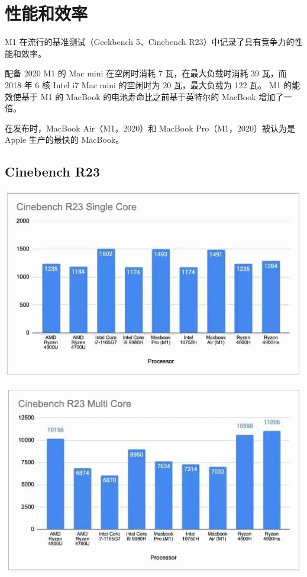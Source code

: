 \documentclass[a4paper]{article}
\begin{document}
\section{性能和效率}

M1 在流行的基准测试（Geekbench 5、Cinebench R23）中记录了具有竞争力的性能和效率。

配备 2020 M1 的 Mac mini 在空闲时消耗 7 瓦，在最大负载时消耗 39 瓦，而 2018 年 6 核 Intel i7 Mac mini 的空闲时为 20 瓦，最大负载为 122 瓦。 M1 的能效使基于 M1 的 MacBook 的电池寿命比之前基于英特尔的 MacBook 增加了一倍。

在发布时，MacBook Air（M1，2020）和 MacBook Pro（M1，2020）被认为是 Apple 生产的最快的 MacBook。

\subsection{Cinebench R23}

\includegraphics[width=\textwidth]{Cinebench-R23-Single-Core-Apple-M1.png}

\includegraphics[width=\textwidth]{Cinebench-R23-Multi-Core-Apple-M1.png}
\end{document}
